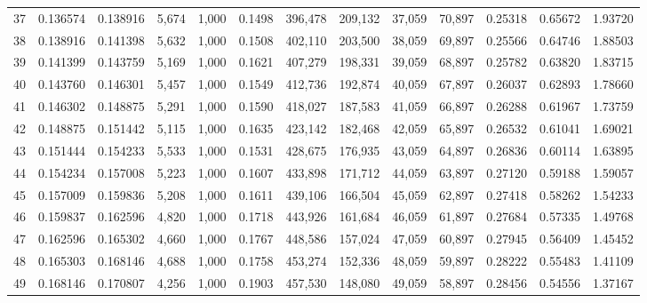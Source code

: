 \begin{tabular}{rrrrrrrrrrrrr}
37  &  0.136574 &  0.138916 &   5,674 &  1,000 &                                     0.1498 &  396,478 &  209,132 &   37,059 &   70,897 &  0.25318 &  0.65672 &  1.93720 \\
38  &  0.138916 &  0.141398 &   5,632 &  1,000 &                                     0.1508 &  402,110 &  203,500 &   38,059 &   69,897 &  0.25566 &  0.64746 &  1.88503 \\
39  &  0.141399 &  0.143759 &   5,169 &  1,000 &                                     0.1621 &  407,279 &  198,331 &   39,059 &   68,897 &  0.25782 &  0.63820 &  1.83715 \\
40  &  0.143760 &  0.146301 &   5,457 &  1,000 &                                     0.1549 &  412,736 &  192,874 &   40,059 &   67,897 &  0.26037 &  0.62893 &  1.78660 \\
41  &  0.146302 &  0.148875 &   5,291 &  1,000 &                                     0.1590 &  418,027 &  187,583 &   41,059 &   66,897 &  0.26288 &  0.61967 &  1.73759 \\
42  &  0.148875 &  0.151442 &   5,115 &  1,000 &                                     0.1635 &  423,142 &  182,468 &   42,059 &   65,897 &  0.26532 &  0.61041 &  1.69021 \\
43  &  0.151444 &  0.154233 &   5,533 &  1,000 &                                     0.1531 &  428,675 &  176,935 &   43,059 &   64,897 &  0.26836 &  0.60114 &  1.63895 \\
44  &  0.154234 &  0.157008 &   5,223 &  1,000 &                                     0.1607 &  433,898 &  171,712 &   44,059 &   63,897 &  0.27120 &  0.59188 &  1.59057 \\
45  &  0.157009 &  0.159836 &   5,208 &  1,000 &                                     0.1611 &  439,106 &  166,504 &   45,059 &   62,897 &  0.27418 &  0.58262 &  1.54233 \\
46  &  0.159837 &  0.162596 &   4,820 &  1,000 &                                     0.1718 &  443,926 &  161,684 &   46,059 &   61,897 &  0.27684 &  0.57335 &  1.49768 \\
47  &  0.162596 &  0.165302 &   4,660 &  1,000 &                                     0.1767 &  448,586 &  157,024 &   47,059 &   60,897 &  0.27945 &  0.56409 &  1.45452 \\
48  &  0.165303 &  0.168146 &   4,688 &  1,000 &                                     0.1758 &  453,274 &  152,336 &   48,059 &   59,897 &  0.28222 &  0.55483 &  1.41109 \\
49  &  0.168146 &  0.170807 &   4,256 &  1,000 &                                     0.1903 &  457,530 &  148,080 &   49,059 &   58,897 &  0.28456 &  0.54556 &  1.37167 \\

\end{tabular}
